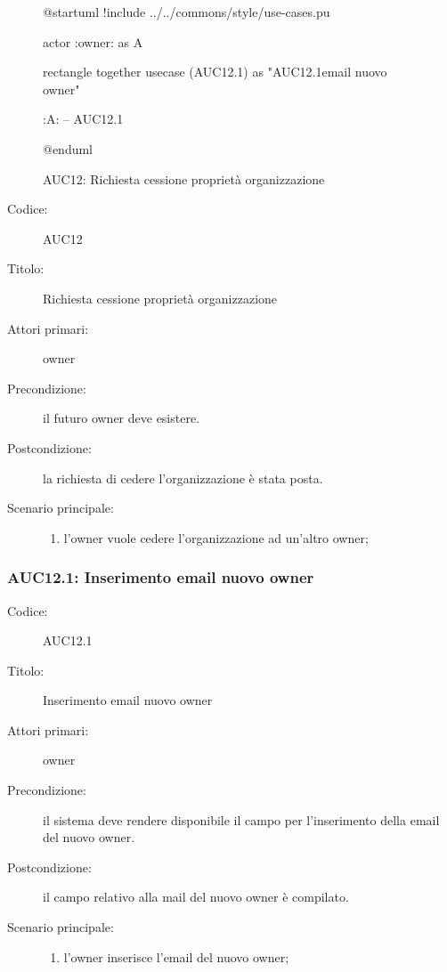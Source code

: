 \documentclass[../../../analisi-dei-requisiti.tex]{subfiles}
\begin{document}
\begin{figure}[H]
  \centering
  \begin{plantuml}
  @startuml
  !include ../../commons/style/use-cases.pu

  actor :owner: as A

  rectangle {
    together {
      usecase (AUC12.1) as "AUC12.1\nInserimento email nuovo owner"
    }
  }

  :A: -- AUC12.1

  @enduml
  \end{plantuml}
  \caption{AUC12: Richiesta cessione proprietà organizzazione}%
  \label{fig:auc12}
\end{figure}

\begin{description}
  \item[Codice:] AUC12
  \item[Titolo:] Richiesta cessione proprietà organizzazione
  \item[Attori primari:] owner
  \item[Precondizione:] il futuro owner deve esistere.
  \item[Postcondizione:] la richiesta di cedere l'organizzazione è stata posta.
  \item[Scenario principale:]
  \begin{enumerate}
    \item l'owner vuole cedere l'organizzazione ad un'altro owner;
  \end{enumerate}
\end{description}

\subsubsection{AUC12.1: Inserimento email nuovo owner}%
\label{subs:AUC12.1}
\begin{description}
  \item[Codice:] AUC12.1
  \item[Titolo:] Inserimento email nuovo owner
  \item[Attori primari:] owner
  \item[Precondizione:] il sistema deve rendere disponibile il campo per l'inserimento della email del nuovo owner.
  \item[Postcondizione:] il campo relativo alla mail del nuovo owner è compilato.
  \item[Scenario principale:]
  \begin{enumerate}
    \item l'owner inserisce l'email del nuovo owner;
  \end{enumerate}
\end{description}
\end{document}
